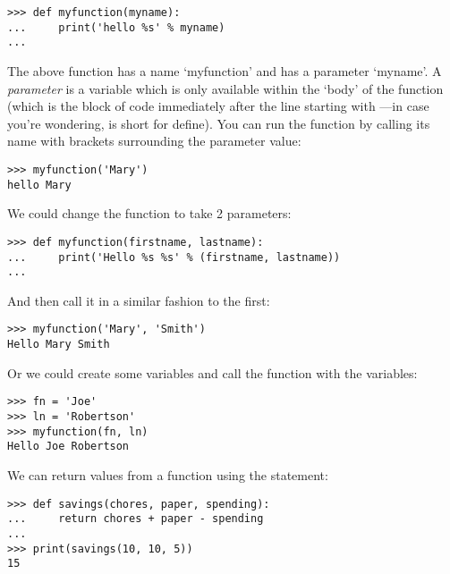 \begin{listing}
\begin{verbatim}
>>> def myfunction(myname):
...     print('hello %s' % myname)
...
\end{verbatim}
\end{listing}

The above function has a name `myfunction' and has a parameter `myname'.  A \emph{parameter} is a variable which is only available within the `body' of the function (which is the block of code immediately after the line starting with ---in case you're wondering,  is short for define).  You can run the function by calling its name with brackets surrounding the parameter value:

\begin{listing}
\begin{verbatim}
>>> myfunction('Mary')
hello Mary
\end{verbatim}
\end{listing}

\noindent
We could change the function to take 2 parameters:

\begin{listing}
\begin{verbatim}
>>> def myfunction(firstname, lastname):
...     print('Hello %s %s' % (firstname, lastname))
...
\end{verbatim}
\end{listing}

\noindent
And then call it in a similar fashion to the first:

\begin{listing}
\begin{verbatim}
>>> myfunction('Mary', 'Smith')
Hello Mary Smith
\end{verbatim}
\end{listing}

\noindent
Or we could create some variables and call the function with the variables:

\begin{listing}
\begin{verbatim}
>>> fn = 'Joe'
>>> ln = 'Robertson'
>>> myfunction(fn, ln)
Hello Joe Robertson
\end{verbatim}
\end{listing}

\noindent
We can return values from a function using the  statement:

\begin{listing}
\begin{verbatim}
>>> def savings(chores, paper, spending):
...     return chores + paper - spending
...
>>> print(savings(10, 10, 5))
15
\end{verbatim}
\end{listing}

